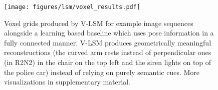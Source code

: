 \begin{figure}
\texttt{[image: figures/lsm/voxel\_results.pdf]}
\caption{Voxel grids produced by V-LSM for example image sequences alongside a learning based baseline which uses pose information in a fully connected manner. V-LSM produces geometrically meaningful reconstructions (\eg the curved arm rests instead of perpendicular ones (in R2N2) in the chair on the top left and the siren lights on top of the police car) instead of relying on purely semantic cues. More visualizations in supplementary material.}
\end{figure}